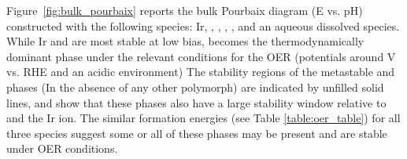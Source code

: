 %
%
Figure~\ref{fig:bulk_pourbaix} reports the bulk \IrOx Pourbaix diagram (E vs. pH) constructed with the following species: Ir, \rIrOtwo, \aIrOthree,  \rIrOthree, \bIrOthree, and an aqueous dissolved  species.
%
While Ir and \rIrOtwo are most stable at low bias, \aIrOthree becomes the thermodynamically dominant phase under the relevant conditions for the OER (potentials around  V vs. RHE and an acidic environment)
%
%
The stability regions of the metastable \rIrOthree and \bIrOthree phases (In the absence of any other \IrOthree polymorph) are indicated by unfilled solid lines, and show that these phases also have a large stability window relative to \IrOtwo and the Ir ion.
%
The similar formation energies (see Table \ref{table:oer_table}) for all three \IrOthree species suggest some or all of these \IrOthree phases may be present and are stable under OER conditions.


%
%
%



